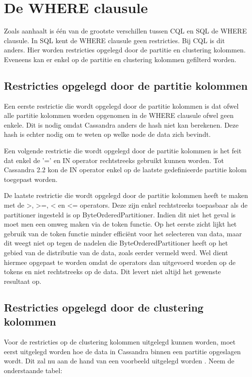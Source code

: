 \section{De WHERE clausule}
Zoals \cite{Lerer2015Where} aanhaalt is één van de grootste verschillen tussen CQL en SQL de WHERE clausule.
In SQL kent de WHERE clausule geen restricties.
Bij CQL is dit anders.
Hier worden restricties opgelegd door de partitie en clustering kolommen.
Eveneens kan er enkel op de partitie en clustering kolommen gefilterd worden.

\subsection{Restricties opgelegd door de partitie kolommen}

Een eerste restrictie die wordt opgelegd door de partitie kolommen is dat ofwel alle partitie kolommen worden opgenomen in de WHERE clausule ofwel geen enkele.
Dit is nodig omdat Cassandra anders de hash niet kan berekenen.
Deze hash is echter nodig om te weten op welke node de data zich bevindt.

Een volgende restrictie die wordt opgelegd door de partitie kolommen is het feit dat enkel de '=' en IN operator rechtstreeks gebruikt kunnen worden.
Tot Cassandra 2.2 kon de IN operator enkel op de laatste gedefinieerde partitie kolom toegepast worden.

De laatste restrictie die wordt opgelegd door de partitie kolommen heeft te maken met de >, >=, < en <= operators.
Deze zijn enkel rechtstreeks toepasbaar als de partitioner ingesteld is op ByteOrderedPartitioner.
Indien dit niet het geval is moet men een omweg maken via de token functie.
Op het eerste zicht lijkt het gebruik van de token functie minder efficiënt voor het selecteren van data, maar dit weegt niet op tegen de nadelen die ByteOrderedPartitioner heeft op het gebied van de distributie van de data, zoals eerder vermeld werd.
Wel dient hiermee opgepast te worden omdat de operators dan uitgevoerd worden op de tokens en niet rechtstreeks op de data.
Dit levert niet altijd het gewenste resultaat op.

\subsection{Restricties opgelegd door de clustering kolommen}
Voor de restricties op de clustering kolommen uitgelegd kunnen worden, moet eerst uitgelegd worden hoe de data in Cassandra binnen een partitie opgeslagen wordt.
Dit zal nu aan de hand van een voorbeeld uitgelegd worden \citep{Lerer2015Where}.
Neem de onderstaande tabel:

